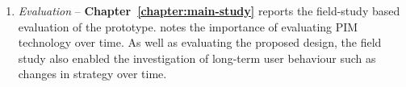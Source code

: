 \begin{enumerate}
\item \textit{Evaluation} -- \textbf{Chapter~\ref{chapter:main-study}} reports the field-study based evaluation of the prototype. \citet{ml:92} notes the importance of evaluating PIM technology over time. As well as evaluating the proposed design, the field study also enabled the investigation of long-term user behaviour such as changes in strategy over time. 


\end{enumerate}






